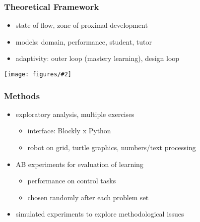\documentclass[bigger]{beamer}
\newcommand{\img}[2]{
  \begin{center}
    \texttt{[image: figures/\#2]}
  \end{center}
}
\begin{document}
\begin{frame}
  \frametitle{Theoretical Framework}

  \begin{itemize}
  \item state of flow, zone of proximal development

  \item models: domain, performance, student, tutor

  \item adaptivity: outer loop (mastery learning), design loop %
  \end{itemize}

  \img{0.9}{robomission-tutor-model}

\end{frame}


\begin{frame}
  \frametitle{Methods}

  \begin{itemize}
  \item exploratory analysis, multiple exercises
    \begin{itemize}
    \item interface: Blockly x Python
    \item robot on grid, turtle graphics, numbers/text processing
    \end{itemize}

  \item AB experiments for evaluation of learning
    \begin{itemize}
    \item performance on control tasks
    \item chosen randomly after each problem set
    \end{itemize}

  \item simulated experiments to explore methodological issues
  \end{itemize}

\end{frame}
\end{document}
